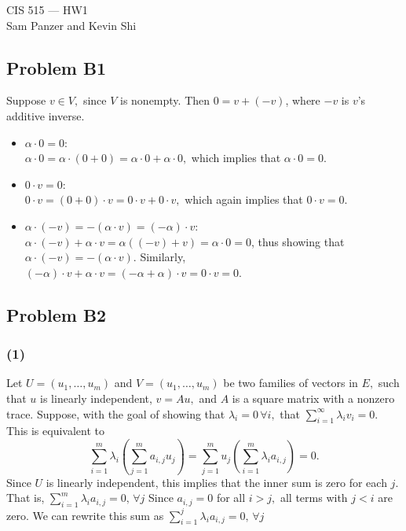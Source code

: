 \documentclass{article}
\begin{document}
\begin{center}CIS 515 --- HW1\\Sam Panzer and Kevin Shi\end{center}
\subsection{Problem B1}
  Suppose $v \in V,$ since $V$ is nonempty. Then $0 = v + (-v)$, where $-v$ is $v$'s additive inverse.
\begin{itemize}
  \item $\alpha \cdot 0 = 0$:\\
    $\alpha\cdot 0 = \alpha\cdot(0 + 0) = \alpha\cdot 0 + \alpha\cdot 0,$ which
    implies that $\alpha\cdot 0 = 0.$
  \item $0\cdot v = 0$: \\
    $0 \cdot v = (0 + 0)\cdot v = 0 \cdot v + 0 \cdot v,$ which again implies
    that $0 \cdot v = 0.$
  \item $\alpha \cdot (-v) = -(\alpha \cdot v) = (-\alpha) \cdot v$:\\
  $\alpha \cdot (-v) + \alpha \cdot v = \alpha ((-v) + v) = \alpha \cdot 0 = 0$,
  thus showing that $\alpha \cdot (-v) =  -(\alpha \cdot v).$ Similarly,
  $(-\alpha) \cdot v + \alpha \cdot v = (-\alpha + \alpha)\cdot v =
  0 \cdot v = 0$.
  \end{itemize}

\subsection{Problem B2}
\subsubsection{(1)}
Let $U = (u_1,\dots,u_m)$ and $V = (u_1,\dots,u_m)$ be two families of
vectors in $E,$ such that $u$ is linearly independent, $v = Au,$ and $A$
is a square matrix with a nonzero trace.
Suppose, with the goal of showing that $\lambda_i = 0\, \forall i,$ that 
$\displaystyle{\sum_{i=1}^\infty \lambda_i v_i = 0}.$ This is equivalent to
\[ \sum_{i=1}^m\lambda_i\left( \sum_{j=1}^m a_{i,j}u_j \right) = 
   \sum_{j=1}^m u_j\left( \sum_{i=1}^m \lambda_i a_{i,j} \right) = 0.
\]
Since $U$ is linearly independent, this implies that the inner sum is zero for
each $j.$ That is,
$\displaystyle{ \sum_{i=1}^m \lambda_i a_{i,j} = 0, \,\forall j }$
Since $a_{i,j} = 0$ for all $i > j,$ all terms with $j < i$ are zero. We can
rewrite this sum as
$\displaystyle{ \sum_{i=1}^j \lambda_i a_{i,j} = 0, \,\forall j }$
\end{document}
